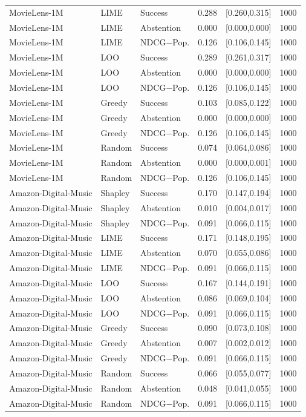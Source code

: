 \begin{table}[!htbp]
\begin{tabular}{@{}lllrrr@{}}
MovieLens-1M & LIME & Success & 0.288 & [0.260,0.315] & 1000 \\
MovieLens-1M & LIME & Abstention & 0.000 & [0.000,0.000] & 1000 \\
MovieLens-1M & LIME & NDCG$-$Pop. & 0.126 & [0.106,0.145] & 1000 \\
MovieLens-1M & LOO & Success & 0.289 & [0.261,0.317] & 1000 \\
MovieLens-1M & LOO & Abstention & 0.000 & [0.000,0.000] & 1000 \\
MovieLens-1M & LOO & NDCG$-$Pop. & 0.126 & [0.106,0.145] & 1000 \\
MovieLens-1M & Greedy & Success & 0.103 & [0.085,0.122] & 1000 \\
MovieLens-1M & Greedy & Abstention & 0.000 & [0.000,0.000] & 1000 \\
MovieLens-1M & Greedy & NDCG$-$Pop. & 0.126 & [0.106,0.145] & 1000 \\
MovieLens-1M & Random & Success & 0.074 & [0.064,0.086] & 1000 \\
MovieLens-1M & Random & Abstention & 0.000 & [0.000,0.001] & 1000 \\
MovieLens-1M & Random & NDCG$-$Pop. & 0.126 & [0.106,0.145] & 1000 \\
Amazon-Digital-Music & Shapley & Success & 0.170 & [0.147,0.194] & 1000 \\
Amazon-Digital-Music & Shapley & Abstention & 0.010 & [0.004,0.017] & 1000 \\
Amazon-Digital-Music & Shapley & NDCG$-$Pop. & 0.091 & [0.066,0.115] & 1000 \\
Amazon-Digital-Music & LIME & Success & 0.171 & [0.148,0.195] & 1000 \\
Amazon-Digital-Music & LIME & Abstention & 0.070 & [0.055,0.086] & 1000 \\
Amazon-Digital-Music & LIME & NDCG$-$Pop. & 0.091 & [0.066,0.115] & 1000 \\
Amazon-Digital-Music & LOO & Success & 0.167 & [0.144,0.191] & 1000 \\
Amazon-Digital-Music & LOO & Abstention & 0.086 & [0.069,0.104] & 1000 \\
Amazon-Digital-Music & LOO & NDCG$-$Pop. & 0.091 & [0.066,0.115] & 1000 \\
Amazon-Digital-Music & Greedy & Success & 0.090 & [0.073,0.108] & 1000 \\
Amazon-Digital-Music & Greedy & Abstention & 0.007 & [0.002,0.012] & 1000 \\
Amazon-Digital-Music & Greedy & NDCG$-$Pop. & 0.091 & [0.066,0.115] & 1000 \\
Amazon-Digital-Music & Random & Success & 0.066 & [0.055,0.077] & 1000 \\
Amazon-Digital-Music & Random & Abstention & 0.048 & [0.041,0.055] & 1000 \\
Amazon-Digital-Music & Random & NDCG$-$Pop. & 0.091 & [0.066,0.115] & 1000 \\
\bottomrule
\end{tabular}
\end{table}

